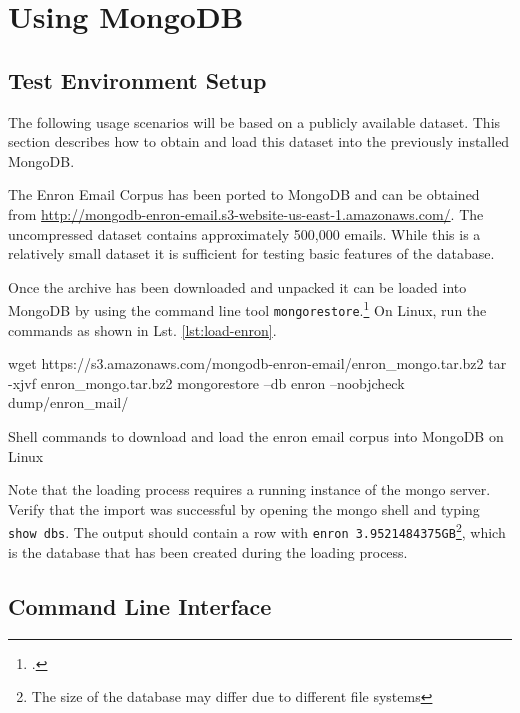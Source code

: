     
\newpage
\section{Using MongoDB}
\label{sec:usage}

\subsection{Test Environment Setup}
\label{sec:test-environment}

The following usage scenarios will be based on a publicly available dataset.
This section describes how to obtain and load this dataset into the previously
installed MongoDB.

The Enron Email Corpus has been ported to MongoDB and can be obtained from
\url{http://mongodb-enron-email.s3-website-us-east-1.amazonaws.com/}.
The uncompressed dataset contains approximately 500,000 emails.
While this is a relatively small dataset it is sufficient for
testing basic features of the database.

Once the archive has been downloaded and unpacked it can be loaded into MongoDB
by using the command line tool
\texttt{mongorestore}.\footcite[Cf.][]{mongo_restore}
 On Linux, run the commands as shown in Lst. \ref{lst:load-enron}.

\begin{listing}
    \begin{bashcode}
    wget https://s3.amazonaws.com/mongodb-enron-email/enron_mongo.tar.bz2
    tar -xjvf enron_mongo.tar.bz2
    mongorestore --db enron --noobjcheck dump/enron_mail/
    \end{bashcode}
    \caption{Shell commands to download and load the enron email corpus into MongoDB on Linux}
    \label{lst:load-enron}
\end{listing}

Note that the loading process requires a running instance of the mongo server.
Verify that the import was successful by opening the mongo shell and typing
\texttt{show dbs}.
The output should contain a row with \texttt{enron 3.9521484375GB}\footnote{The
size of the database may differ due to different file systems}, which is the
database that has been created during the loading process.


\subsection{Command Line Interface}
\label{sec:usage-cli}

